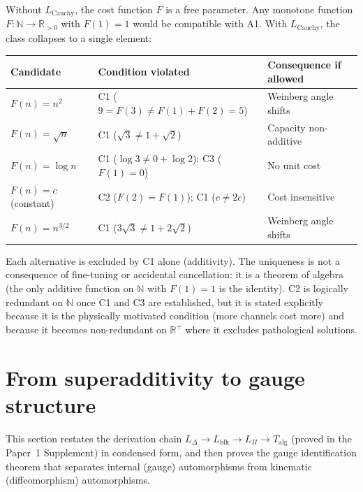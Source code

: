 \documentclass[11pt,a4paper]{article}
\theoremstyle{definition}
\begin{document}
Without $L_{\mathrm{Cauchy}}$, the cost function $F$ is a free parameter.
Any monotone function $F: \mathbb{N} \to \mathbb{R}_{>0}$ with $F(1) = 1$
would be compatible with A1.  With $L_{\mathrm{Cauchy}}$, the class
collapses to a single element:

\smallskip
\begin{center}
\small
\begin{tabular}{@{}lll@{}}
\toprule
\textbf{Candidate} & \textbf{Condition violated} & \textbf{Consequence if allowed} \\
\midrule
$F(n) = n^2$ & C1 ($9 = F(3) \ne F(1) + F(2) = 5$) & Weinberg angle shifts \\
$F(n) = \sqrt{n}$ & C1 ($\sqrt{3} \ne 1 + \sqrt{2}$) & Capacity non-additive \\
$F(n) = \log n$ & C1 ($\log 3 \ne 0 + \log 2$); C3 ($F(1) = 0$) & No unit cost \\
$F(n) = c$ (constant) & C2 ($F(2) = F(1)$); C1 ($c \ne 2c$) & Cost insensitive \\
$F(n) = n^{3/2}$ & C1 ($3\sqrt{3} \ne 1 + 2\sqrt{2}$) & Weinberg angle shifts \\
\bottomrule
\end{tabular}
\end{center}

\smallskip\noindent Each alternative is excluded by C1 alone (additivity).
The uniqueness is not a consequence of fine-tuning or accidental
cancellation: it is a theorem of algebra (the only additive function on
$\mathbb{N}$ with $F(1) = 1$ is the identity).  C2 is logically
redundant on $\mathbb{N}$ once C1 and C3 are established, but it is
stated explicitly because it is the physically motivated condition
(more channels cost more) and because it becomes non-redundant on
$\mathbb{R}^+$ where it excludes pathological solutions.


\newpage


\section{From superadditivity to gauge structure}
\label{sec:nc_chain}

This section restates the derivation chain $L_\Delta \to L_{\mathrm{blk}}
\to L_\Pi \to T_{\mathrm{alg}}$ (proved in the Paper~1 Supplement) in
condensed form, and then proves the gauge identification theorem that
separates internal (gauge) automorphisms from kinematic (diffeomorphism)
automorphisms.
\end{document}
